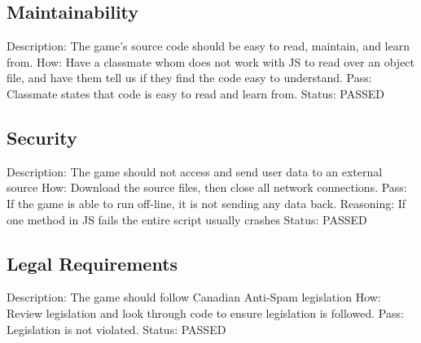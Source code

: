 \documentclass{article}
\begin{document}
 \subsection{Maintainability}
 \label{sec:4.5}
 Description: The game's source code should be easy to read, maintain, and 
 learn from. \newline
 How: Have a classmate whom does not work with JS to read over an object file, 
 and have them tell us if they find the code easy to understand. \newline
 Pass: Classmate states that code is easy to read and learn from.
 \newline  \newline
Status: PASSED


 \subsection{Security}
 \label{sec:4.6}
Description: The game should not access and send user data to an external 
source \newline
How: Download the source files, then close all network connections.\newline
Pass: If the game is able to run off-line, it is not sending any data back.
Reasoning: If one method in JS fails the entire script usually crashes
\newline  \newline
Status: PASSED

\subsection{Legal Requirements}
\label{sec:4.7}
 Description: The game should follow Canadian Anti-Spam legislation \newline
 How: Review legislation and look through code to ensure legislation is 
 followed. \newline
 Pass: Legislation is not violated.
 \newline  \newline
Status: PASSED
 
\end{document}
